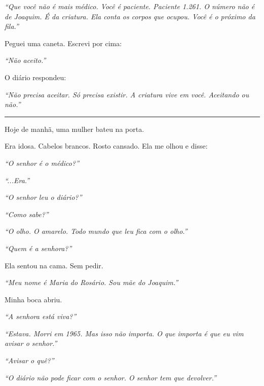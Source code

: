 \noindent \textit{\textquotedblleft{}Que você não é mais médico. Você é paciente. Paciente 1.261. O número não é de Joaquim. É da criatura. Ela conta os corpos que ocupou. Você é o próximo da fila.\textquotedblright{}}

\noindent Peguei uma caneta. Escrevi por cima:

\noindent \textit{\textquotedblleft{}Não aceito.\textquotedblright{}}

\noindent O diário respondeu:

\noindent \textit{\textquotedblleft{}Não precisa aceitar. Só precisa existir. A criatura vive em você. Aceitando ou não.\textquotedblright{}}

\vspace{0.5em}\noindent\rule{\textwidth}{0.5pt}\vspace{0.5em}

\noindent Hoje de manhã, uma mulher bateu na porta.

\noindent Era idosa. Cabelos brancos. Rosto cansado. Ela me olhou e disse:

\noindent \textit{\textquotedblleft{}O senhor é o médico?\textquotedblright{}}

\noindent \textit{\textquotedblleft{}...Era.\textquotedblright{}}

\noindent \textit{\textquotedblleft{}O senhor leu o diário?\textquotedblright{}}

\noindent \textit{\textquotedblleft{}Como sabe?\textquotedblright{}}

\noindent \textit{\textquotedblleft{}O olho. O amarelo. Todo mundo que leu fica com o olho.\textquotedblright{}}

\noindent \textit{\textquotedblleft{}Quem é a senhora?\textquotedblright{}}

\noindent Ela sentou na cama. Sem pedir.

\noindent \textit{\textquotedblleft{}Meu nome é Maria do Rosário. Sou mãe do Joaquim.\textquotedblright{}}

\noindent Minha boca abriu.

\noindent \textit{\textquotedblleft{}A senhora está viva?\textquotedblright{}}

\noindent \textit{\textquotedblleft{}Estava. Morri em 1965. Mas isso não importa. O que importa é que eu vim avisar o senhor.\textquotedblright{}}

\noindent \textit{\textquotedblleft{}Avisar o quê?\textquotedblright{}}

\noindent \textit{\textquotedblleft{}O diário não pode ficar com o senhor. O senhor tem que devolver.\textquotedblright{}}


